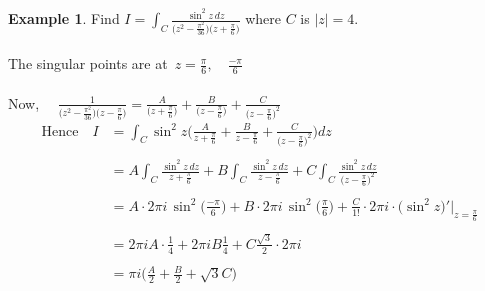 \documentclass[11pt,a4paper]{article}
\theoremstyle{definition}
\newtheorem{example}[thm]{Example}
\begin{document}
\begin{example}
Find $\displaystyle{I = \int_C \frac{\sin^2z\,dz}{\Big(z^2 - \frac{\pi^2}{36}\Big)\Big(z+\frac{\pi}{6}\Big)}}$ where $C$ is $\left|z\right|= 4$.\\\\


The singular points are at $\, z = \frac{\pi}{6},\quad  \frac{-\pi}{6}$\\\\

Now, $\quad \frac{1}{\Big(z^2 - \frac{\pi^2}{36}\Big)\Big(z - \frac{\pi}{6}\Big)} = \frac{A}{\Big(z + \frac{\pi}{6}\Big)} + \frac{B}{\Big(z - \frac{\pi}{6}\Big)} + \frac{C}{\Big(z - \frac{\pi}{6}\Big)^2}$\\



\begin{align*}
\text{Hence}\quad  I & = \int_C \sin^2z\Bigg(\frac{A}{z + \frac{\pi}{6}} + \frac{B}{z - \frac{\pi}{6}} + \frac{C}{\Big(z - \frac{\pi}{6}\Big)^2}\Bigg)dz\\\\
& = A\int_C\frac{\sin^2z\,dz}{z + \frac{\pi}{6} } + B\int_C\frac{\sin^2z\,dz}{z  -\frac{\pi}{6}} + C\int_C\frac{\sin^2z\,dz}{\Big(z-\frac{\pi}{6}\Big)^2}\\\\
& = A\cdot 2\pi i \, \sin^2\Big(\frac{-\pi}{6}\Big) + B\cdot 2\pi i\,\sin^2\big(\frac{\pi}{6}\big) + \frac{C}{1!}\cdot 2\pi i\cdot\Big(\sin^2z\Big)'\Bigg|_{z = \frac{\pi}{6}}\\\\
& = 2\pi i A\cdot\frac{1}{4} + 2\pi i B \frac{1}{4} + C\frac{\sqrt{3}}{2}\cdot 2\pi i\\\\
& = \pi i\Bigg(\frac{A}{2} + \frac{B}{2} + \sqrt{3} C\Bigg)\\\\
\end{align*}
\end{example}
\end{document}
